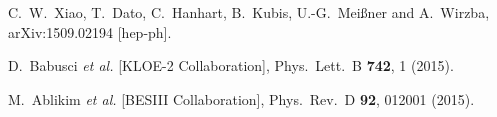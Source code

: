 \documentclass[preprint,12pt,3p]{elsarticle}
\newcommand{\0}{}
\begin{document}
\begin{thebibliography}{99}
  C.~W.~Xiao, T.~Dato, C.~Hanhart, B.~Kubis, U.-G.~Mei{\ss}ner and A.~Wirzba,
  arXiv:1509.02194 [hep-ph].

  D.~Babusci {\it et al.} [KLOE-2 Collaboration],
  Phys.\ Lett.\ B {\bf 742}, 1 (2015).

  M.~Ablikim {\it et al.} [BESIII Collaboration],
  Phys.\ Rev.\ D {\bf 92}, 012001 (2015).

\end{thebibliography}
\end{document}

